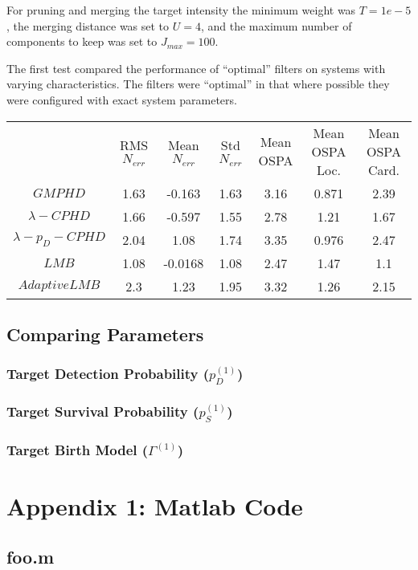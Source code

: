 \documentclass{article}
\begin{document}
For pruning and merging the target intensity the minimum weight was $T = 1e-5$, the merging distance was set to $U = 4$, and the maximum number of components to keep was set to $J_{max} = 100$. 


The first test compared the performance of ``optimal'' filters on systems with varying characteristics. The filters were ``optimal'' in that where possible they were configured with exact system parameters.

\begin{tabular}{ c c c c c c c }
   & RMS $N_{err}$ & Mean $N_{err}$ & Std $N_{err}$ & Mean OSPA & Mean OSPA Loc. & Mean OSPA Card.\\
  $GMPHD$ & 1.63 & -0.163 & 1.63 & 3.16 & 0.871 & 2.39 \\
  $\lambda-CPHD$ & 1.66 & -0.597 & 1.55 & 2.78 & 1.21 & 1.67 \\
  $\lambda-p_D-CPHD$ & 2.04 & 1.08 & 1.74 & 3.35 & 0.976 & 2.47 \\
  $LMB$ & 1.08 & -0.0168 & 1.08 & 2.47 & 1.47 & 1.1 \\
  $Adaptive LMB$ & 2.3 & 1.23 & 1.95 & 3.32 & 1.26 & 2.15 \\
\end{tabular}

\subsection*{Comparing Parameters}

\subsubsection*{Target Detection Probability ($p_D^{(1)}$)}
\subsubsection*{Target Survival Probability ($p_S^{(1)}$)}
\subsubsection*{Target Birth Model ($\Gamma^{(1)}$)}



\clearpage
\pagebreak
\printbibliography

\section*{Appendix 1: Matlab Code}
\subsection*{foo.m}
\begin{lstlisting}[language=Matlab]
\end{lstlisting}
\end{document}
